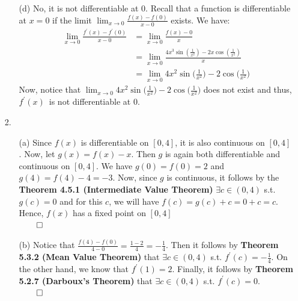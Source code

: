 \documentclass[11pt]{article}
\begin{document}
\begin{itemize}
\begin{itemize}
            \item[(d)]
                No, it is not differentiable at $0$. Recall that a function is
                differentiable at $x = 0$ if the limit $\lim_{x \to 0}
                \frac{f(x) - f(0)}{x - 0}$ exists. We have:
                \begin{align*}
                    \lim_{x \to 0} \frac{f^\prime(x) - f^\prime(0)}{x - 0}
                        &= \lim_{x \to 0} \frac{f(x) - 0}{x}\\
                        &= \lim_{x \to 0} \frac{4x^3 \sin{(\frac{1}{x^2})} -
                            2x\cos{(\frac{1}{x^2})}}{x}\\
                        &= \lim_{x \to 0} 4x^2 \sin{\Big(\frac{1}{x^2}\Big)} -
                            2 \cos{\Big(\frac{1}{x^2}\Big)}
                \end{align*}
                Now, notice that $\lim_{x \to 0} 4x^2
                \sin{\Big(\frac{1}{x^2}\Big)} - 2
                \cos{\Big(\frac{1}{x^2}\Big)}$ does not exist and thus,
                $f^\prime(x)$\ is not differentiable at $0$.
        \end{itemize}

    \item[2.]
        \begin{itemize}
            \item[(a)]
                Since $f(x)$ is differentiable on $[0, 4]$, it is also
                continuous on $[0, 4]$. Now, let $g(x) = f(x) - x$. Then $g$ is
                again both differentiable and continuous on $[0, 4]$. We have
                $g(0) = f(0) = 2$ and $g(4) = f(4) - 4 = -3$. Now, since $g$ is
                continuous, it follows by the \textbf{Theorem 4.5.1
                (Intermediate Value Theorem)} $\exists c \in (0, 4)$ s.t.
                $g(c) = 0$ and for this $c$, we will have $f(c) = g(c) + c = 0
                + c = c$. Hence, $f(x)$ has a fixed point on $[0, 4]$\\
                $\qed$

            \item[(b)]
                Notice that $\frac{f(4) - f(0)}{4 - 0} = \frac{1 - 2}{4} =
                -\frac{1}{4}$. Then it follows by \textbf{Theorem 5.3.2 (Mean
                Value Theorem)} that $\exists c \in (0, 4)$ s.t. $f^\prime(c) =
                -\frac{1}{4}$. On the other hand, we know that $f^\prime(1) =
                2$. Finally, it follows by \textbf{Theorem 5.2.7 (Darboux’s
                Theorem)} that $\exists c \in (0, 4)$ s.t. $f^\prime(c) = 0$.\\
                $\qed$
        \end{itemize}


\end{itemize}
\end{document}
